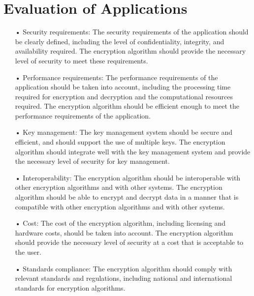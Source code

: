 \documentclass[a4paper,11pt]{report}
\begin{document}
\section{Evaluation of Applications}
\begin{itemize}
\item[•] Security requirements: The security requirements of the application should be clearly defined, including the level of confidentiality, integrity, and availability required. The encryption algorithm should provide the necessary level of security to meet these requirements.

\item[•] Performance requirements: The performance requirements of the application should be taken into account, including the processing time required for encryption and decryption and the computational resources required. The encryption algorithm should be efficient enough to meet the performance requirements of the application.

\item[•] Key management: The key management system should be secure and efficient, and should support the use of multiple keys. The encryption algorithm should integrate well with the key management system and provide the necessary level of security for key management.

\item[•] Interoperability: The encryption algorithm should be interoperable with other encryption algorithms and with other systems. The encryption algorithm should be able to encrypt and decrypt data in a manner that is compatible with other encryption algorithms and with other systems.

\item[•] Cost: The cost of the encryption algorithm, including licensing and hardware costs, should be taken into account. The encryption algorithm should provide the necessary level of security at a cost that is acceptable to the user.

\item[•] Standards compliance: The encryption algorithm should comply with relevant standards and regulations, including national and international standards for encryption algorithms.
\end{itemize}
\end{document}
